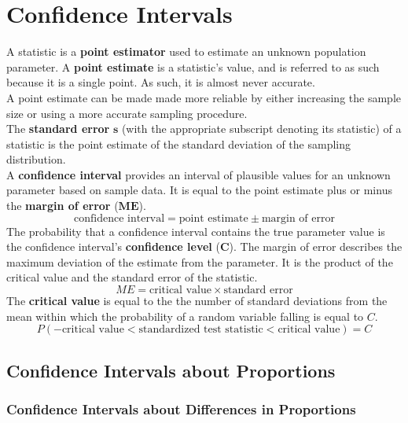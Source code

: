 \documentclass[../AP_Statistics.tex]{subfiles}
\begin{document}
	\chapter{Confidence Intervals}
		A statistic is a \textbf{point estimator} used to estimate an unknown population parameter. A \textbf{point estimate} is a statistic's value, and is referred to as such because it is a single point. As such, it is almost never accurate. \\
		A point estimate can be made made more reliable by either increasing the sample size or using a more accurate sampling procedure. \\
		The \textbf{standard error} $\pmb{s}$ (with the appropriate subscript denoting its statistic) of a statistic is the point estimate of the standard deviation of the sampling distribution. \\
		A \textbf{confidence interval} provides an interval of plausible values for an unknown parameter based on sample data. It is equal to the point estimate plus or minus the \textbf{margin of error} ($\pmb{ME}$).
		\[\text{confidence interval} = \text{point estimate} \pm \text{margin of error}\]
		The probability that a confidence interval contains the true parameter value is the confidence interval's \textbf{confidence level} ($\pmb{C}$).
		The margin of error describes the maximum deviation of the estimate from the parameter. It is the product of the critical value and the standard error of the statistic.
		\[ME = \text{critical value} \times \text{standard error}\]
		The \textbf{critical value} is equal to the the number of standard deviations from the mean within which the probability of a random variable falling is equal to $C$.
		\[P(-\text{critical value} < \text{standardized test statistic} < \text{critical value}) = C\]
		\section{Confidence Intervals about Proportions}
			\subsection*{Confidence Intervals about Differences in Proportions}
\end{document}
